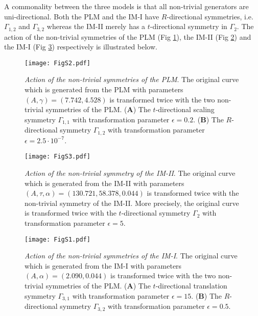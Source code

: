 A commonality between the three models is that all non-trivial generators are uni-directional. Both the PLM and the IM-I have $R$-directional symmetries, i.e. $\Gamma_{1,2}$ and $\Gamma_{3,2}$ whereas the IM-II
 merely has a $t$-directional symmetry in $\Gamma_{2}$. The action of the non-trivial symmetries of the PLM (Fig \ref{fig:PLM}), the IM-II (Fig \ref{fig:IM-II}) and the IM-I (Fig \ref{fig:IM-I}) respectively is illustrated below.

\begin{figure}[htbp!]
\texttt{[image: FigS2.pdf]}
\caption[Action of the non-trivial symmetries of the PLM]{\textit{Action of the non-trivial symmetries of the PLM}. The original curve which is generated from the PLM with parameters $(A,\gamma)=(7.742,4.528)$ is transformed twice with the two non-trivial symmetries of the PLM. (\textbf{A}) The $t$-directional scaling symmetry $\Gamma_{1,1}$ with transformation parameter $\epsilon=0.2$. (\textbf{B}) The $R$-directional symmetry $\Gamma_{1,2}$ with transformation parameter $\epsilon=2.5\cdot 10^{-7}$.}
\label{fig:PLM}
\end{figure}

\begin{figure}[htbp!]
\texttt{[image: FigS3.pdf]}
\caption[Action of the non-trivial symmetry of the IM-II]{\textit{Action of the non-trivial symmetry of the IM-II}. The original curve which is generated from the IM-II with parameters $(A,\tau,\alpha)=(130.721,58.378,0.044)$ is transformed twice with the non-trivial symmetry of the IM-II. More precisely, the original curve is transformed twice with the $t$-directional symmetry $\Gamma_{2}$ with transformation parameter $\epsilon=5$.}
\label{fig:IM-II}
\end{figure}




\begin{figure}[htbp!]
\texttt{[image: FigS1.pdf]}
\caption[Action of the non-trivial symmetries of the IM-I]{\textit{Action of the non-trivial symmetries of the IM-I}. The original curve which is generated from the IM-I with parameters $(A,\alpha)=(2.090,0.044)$ is transformed twice with the two non-trivial symmetries of the PLM. (\textbf{A}) The $t$-directional translation symmetry $\Gamma_{3,1}$ with transformation parameter $\epsilon=15$. (\textbf{B}) The $R$-directional symmetry $\Gamma_{3,2}$ with transformation parameter $\epsilon=0.5$.}
\label{fig:IM-I}
\end{figure}